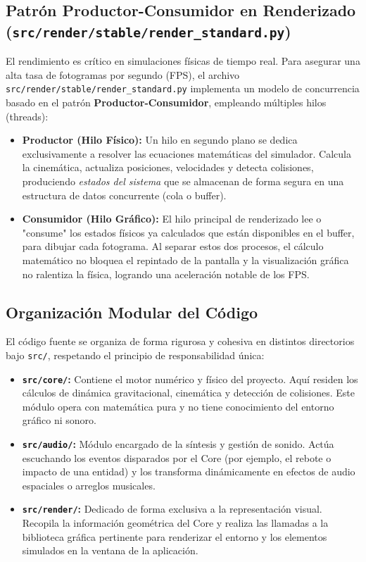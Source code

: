 \documentclass[12pt, openany]{book}
\begin{document}
\subsection{Patrón Productor-Consumidor en Renderizado (\texttt{src/render/stable/render\_standard.py})}
El rendimiento es crítico en simulaciones físicas de tiempo real. Para asegurar una alta tasa de fotogramas por segundo (FPS), el archivo \texttt{src/render/stable/render\_standard.py} implementa un modelo de concurrencia basado en el patrón \textbf{Productor-Consumidor}, empleando múltiples hilos (threads):

\begin{itemize}
    \item \textbf{Productor (Hilo Físico):} Un hilo en segundo plano se dedica exclusivamente a resolver las ecuaciones matemáticas del simulador. Calcula la cinemática, actualiza posiciones, velocidades y detecta colisiones, produciendo \textit{estados del sistema} que se almacenan de forma segura en una estructura de datos concurrente (cola o buffer).
    \item \textbf{Consumidor (Hilo Gráfico):} El hilo principal de renderizado lee o "consume" los estados físicos ya calculados que están disponibles en el buffer, para dibujar cada fotograma. Al separar estos dos procesos, el cálculo matemático no bloquea el repintado de la pantalla y la visualización gráfica no ralentiza la física, logrando una aceleración notable de los FPS.
\end{itemize}

\subsection{Organización Modular del Código}
El código fuente se organiza de forma rigurosa y cohesiva en distintos directorios bajo \texttt{src/}, respetando el principio de responsabilidad única:

\begin{itemize}
    \item \textbf{\texttt{src/core/}:} Contiene el motor numérico y físico del proyecto. Aquí residen los cálculos de dinámica gravitacional, cinemática y detección de colisiones. Este módulo opera con matemática pura y no tiene conocimiento del entorno gráfico ni sonoro.
    \item \textbf{\texttt{src/audio/}:} Módulo encargado de la síntesis y gestión de sonido. Actúa escuchando los eventos disparados por el Core (por ejemplo, el rebote o impacto de una entidad) y los transforma dinámicamente en efectos de audio espaciales o arreglos musicales.
    \item \textbf{\texttt{src/render/}:} Dedicado de forma exclusiva a la representación visual. Recopila la información geométrica del Core y realiza las llamadas a la biblioteca gráfica pertinente para renderizar el entorno y los elementos simulados en la ventana de la aplicación.
\end{itemize}
\end{document}
